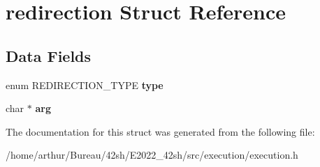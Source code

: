 \hypertarget{structredirection}{}\section{redirection Struct Reference}
\label{structredirection}
\subsection*{Data Fields}
\begin{DoxyCompactItemize}
\item 
\mbox{\label{structredirection_aba9e873db59f44f4a557f929b29ae56d}} 
enum R\+E\+D\+I\+R\+E\+C\+T\+I\+O\+N\+\_\+\+T\+Y\+PE {\bfseries type}
\item 
\mbox{\label{structredirection_a4735e04e3a1e83180ddcee87243b6912}} 
char $\ast$ {\bfseries arg}
\end{DoxyCompactItemize}


The documentation for this struct was generated from the following file\+:\begin{DoxyCompactItemize}
\item 
/home/arthur/\+Bureau/42sh/\+E2022\+\_\+42sh/src/execution/execution.\+h\end{DoxyCompactItemize}
